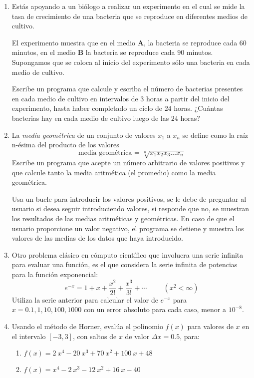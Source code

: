 \begin{enumerate}
\item Estás apoyando a un biólogo a realizar un experimento en el cual se mide la tasa de crecimiento de una bacteria que se reproduce en diferentes medios de cultivo.
\par
El experimento muestra que en el medio \textbf{A}, la bacteria se reproduce cada $60$ minutos, en el medio \textbf{B} la bacteria se reproduce cada $90$ minutos. Supongamos que se coloca al inicio del experimento sólo una bacteria en cada medio de cultivo.
\par
Escribe un programa que calcule y escriba el número de bacterias presentes en cada medio de cultivo en intervalos de $3$ horas a partir del inicio del experimento, hasta haber completado un ciclo de $24$ horas. ¿Cuántas bacterias hay en cada medio de cultivo luego de las $24$ horas?
\item La \textit{media geométrica} de un conjunto de valores $x_{1}$ a $x_{n}$ se define como la raíz n-ésima del producto de los valores
\[ \text{media geométrica = } \sqrt[n]{x_{1}x_{2}x_{3} \ldots x_{n}}\]
Escribe un programa que acepte un número arbitrario de valores positivos y que calcule tanto la media aritmética (el promedio) como la media geométrica.
\par
Usa un bucle para introducir los valores positivos, se le debe de preguntar al usuario si desea seguir introduciendo valores, si responde que no, se muestran los resultados de las medias aritméticas y geométricas. En caso de que el usuario proporcione un valor negativo, el programa se detiene y muestra los valores de las medias de los datos que haya introducido.
\item Otro problema clásico en cómputo científico que involucra una serie infinita para evaluar una función, es el que considera la serie infinita de potencias para la función exponencial:
\[e^{-x} = 1 + x + \dfrac{x^{2}}{2!} + \dfrac{x^{3}}{3!} +\cdots \hspace{1cm} (x^{2} < \infty)  \]
Utiliza la serie anterior para calcular el valor de $e^{-x}$ para $x=0.1, 1, 10, 100, 1000$ con un error absoluto para cada caso, menor a $10^{-8}$.
\item Usando el método de Horner, evalúa el polinomio $f(x)$ para valores de $x$ en el intervalo $[-3,3]$, con saltos de $x$ de valor $\Delta x = 0.5$, para:
\begin{enumerate}
\item $f(x) = 2 \: x^{4} - 20\: x^{3} + 70 \: x^{2} + 100 \: x + 48$
\item $f(x) = x^{4} - 2 \: x^{3} - 12 \: x^{2} + 16 \: x - 40$

\end{enumerate}
\end{enumerate}
